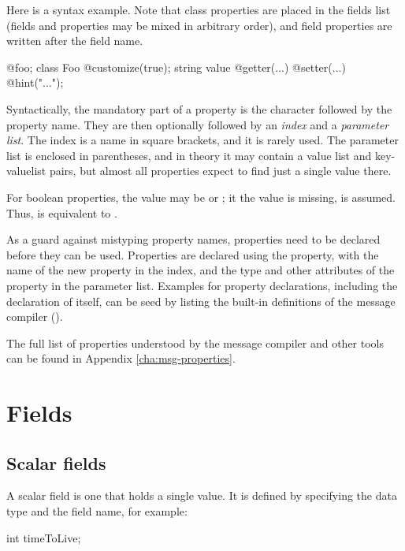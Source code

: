 Here is a syntax example. Note that class properties are placed in the fields
list (fields and properties may be mixed in arbitrary order), and field
properties are written after the field name.

\begin{msg}
@foo;
class Foo {
  @customize(true);
  string value @getter(...) @setter(...) @hint("...");
}
\end{msg}

Syntactically, the mandatory part of a property is the  character
followed by the property name. They are then optionally followed by an
\textit{index} and a \textit{parameter list}. The index is a name in square
brackets, and it is rarely used. The parameter list is enclosed in parentheses,
and in theory it may contain a value list and key-valuelist pairs, but
almost all properties expect to find just a single value there.

For boolean properties, the value may be  or ; it the value
is missing,  is assumed. Thus,  is equivalent to
.

As a guard against mistyping property names, properties need to be declared
before they can be used. Properties are declared using the 
property, with the name of the new property in the index, and the type and other
attributes of the property in the parameter list. Examples for property
declarations, including the declaration of  itself, can be seed
by listing the built-in definitions of the message compiler
().

The full list of properties understood by the message compiler and other {\opp}
tools can be found in Appendix \ref{cha:msg-properties}.



\section{Fields}
\label{sec:msg-defs:fields}

\subsection{Scalar fields}
\label{sec:msg-defs:scalar-fields}

A scalar field is one that holds a single value. It is defined by specifying the
data type and the field name, for example:

\begin{msg}
int timeToLive;
\end{msg}

